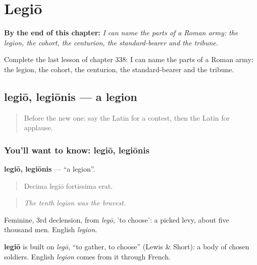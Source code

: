 
\chapter{Legiō}
\label{ch:la-legio}

\begin{chapteropening}
\textbf{By the end of this chapter:} \emph{I can name the parts of a Roman army: the legion, the cohort, the centurion, the standard-bearer and the tribune.}

Complete the last lesson of chapter 338: I can name the parts of a Roman army: the legion, the cohort, the centurion, the standard-bearer and the tribune.
\end{chapteropening}

\section[legiō, legiōnis]{legiō, legiōnis — a legion}

\label{lesson:LA-C338-legio}



\begin{quote}
Before the new one: say the Latin for a contest, then the Latin for applause.
\end{quote}

\subsection*{You'll want to know: legiō, legiōnis}
\textbf{legiō, legiōnis} — \textquotedblleft{}a legion\textquotedblright{}.

\begin{quote}
Decima legiō fortissima erat.
\end{quote}

\begin{quote}
\emph{The tenth legion was the bravest.}
\end{quote}

Feminine, 3rd declension, from \emph{legō}, 'to choose': a picked levy, about five thousand men. English \emph{legion}.

\begin{cousinweb}
\textbf{legiō} is built on \emph{legō}, \textquotedblleft{}to gather, to choose\textquotedblright{} (Lewis \& Short): a body of chosen soldiers. English \emph{legion} comes from it through French.
\end{cousinweb}

